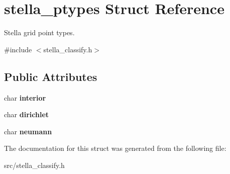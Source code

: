 \hypertarget{structstella__ptypes}{}\section{stella\+\_\+ptypes Struct Reference}
\label{structstella__ptypes}


Stella grid point types.  




{\ttfamily \#include $<$stella\+\_\+classify.\+h$>$}

\subsection*{Public Attributes}
\begin{DoxyCompactItemize}
\item 
\mbox{\label{structstella__ptypes_a5eca5d27cb40a88d4574b28c0ab0a679}} 
char {\bfseries interior}
\item 
\mbox{\label{structstella__ptypes_ac69b0c139df079849cda205ab5e33691}} 
char {\bfseries dirichlet}
\item 
\mbox{\label{structstella__ptypes_a70f2376d71dff617c3f35d2b3cd5aae2}} 
char {\bfseries neumann}
\end{DoxyCompactItemize}


The documentation for this struct was generated from the following file\+:\begin{DoxyCompactItemize}
\item 
src/stella\+\_\+classify.\+h\end{DoxyCompactItemize}
